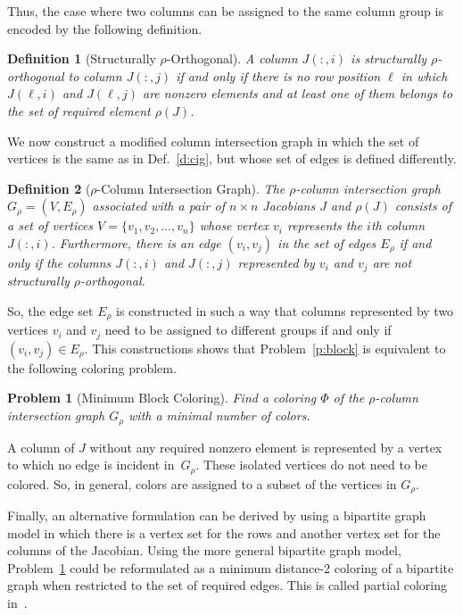 \documentclass[11pt, twoside,a4paper]{book}
\newtheorem{problem}{Problem}
\newtheorem{definition}{Definition}
\newcommand{\sparsifysymbol}{\ensuremath{\rho}}
\newcommand{\sparsify}[1]{\ensuremath{\sparsifysymbol(#1)}}
\begin{document}
Thus, the case where two columns can be assigned to the same column group is encoded by
the following definition.

\begin{definition}[Structurally $\sparsifysymbol$-Orthogonal]
A column $J(:,i)$ is structurally $\sparsifysymbol$-orthogonal to column $J(:,j)$ if and
only if there is no row position $\ell$ in which $J(\ell,i)$ and $J(\ell,j)$ are nonzero
elements and at least one of them belongs to the set of required element \sparsify{J}.
\end{definition}

We now construct a modified column intersection graph in which the set of vertices is the
same as in Def.~\ref{d:cig}, but whose set of edges is defined differently.
%
\begin{definition}[$\sparsifysymbol$-Column Intersection Graph]
\label{d.part.cig}
The $\sparsifysymbol$-column intersection graph $G_\sparsifysymbol =
(V,E_\sparsifysymbol)$ associated with a pair of $n \times n$ Jacobians $J$ and
\sparsify{J} consists of a set of vertices $V=\{v_1, v_2, \dots, v_n\}$ whose vertex
$v_i$ represents the $i$th column $J(:,i)$. Furthermore, there is an edge $(v_i,v_j)$ in
the set of edges $E_\sparsifysymbol$ if and only if the columns $J(:,i)$ and $J(:,j)$
represented by $v_i$ and $v_j$ are not structurally $\sparsifysymbol$-orthogonal.
\end{definition}

So, the edge set $E_\sparsifysymbol$ is constructed in such a way that columns
represented by two vertices $v_i$ and $v_j$ need to be assigned to different groups if
and only if $(v_i, v_j) \in E_\sparsifysymbol$. This constructions shows that
Problem~\ref{p:block} is equivalent to the following coloring problem.
%
\begin{problem}[Minimum Block Coloring]
\label{p:minblockcol}
%
Find a coloring $\Phi$ of the $\sparsifysymbol$-column intersection graph
$G_\sparsifysymbol$ with a minimal number of colors.
\end{problem}

A column of $J$ without any required nonzero element is represented by a vertex to which
no edge is incident in~$G_\sparsifysymbol$. These isolated vertices do not need to be
colored. So, in general, colors are assigned to a subset of the vertices in
$G_\sparsifysymbol$.

Finally, an alternative formulation can be derived by using a bipartite graph model in
which there is a vertex set for the rows and another vertex set for the columns of the
Jacobian. Using the more general bipartite graph model, Problem~\ref{p:minblockcol} could
be reformulated as a minimum distance-2 coloring of a bipartite graph when restricted to
the set of required edges. This is called partial coloring in~\cite{Gebremedhin05whatcolor}.
\end{document}
